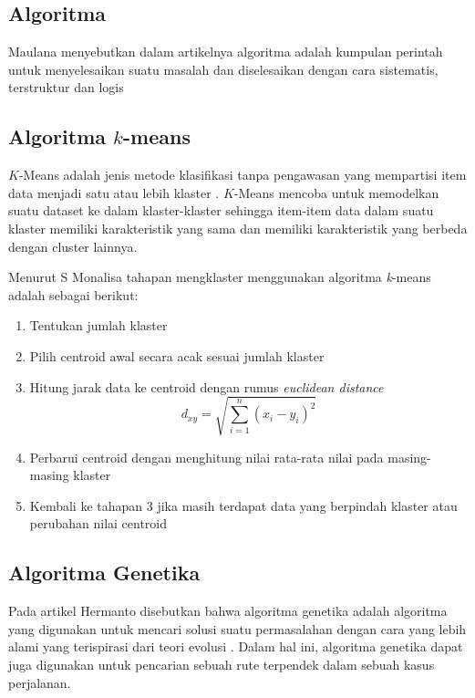 \subsection{Algoritma}

Maulana menyebutkan dalam artikelnya algoritma adalah kumpulan perintah untuk menyelesaikan suatu masalah dan diselesaikan dengan cara sistematis, terstruktur dan logis \cite{maulana2017pembelajaran}

\subsection{Algoritma $k$-means}

$K$-Means adalah jenis metode klasifikasi tanpa pengawasan yang mempartisi item data menjadi satu atau lebih klaster \cite{agusta2007k}. $K$-Means mencoba untuk memodelkan suatu dataset ke dalam klaster-klaster sehingga item-item data dalam suatu klaster memiliki karakteristik yang sama dan memiliki karakteristik yang berbeda dengan cluster lainnya.

Menurut S Monalisa \cite{monalisa2018klasterisasi} tahapan mengklaster menggunakan algoritma \textit{k}-means adalah sebagai berikut:

\begin{enumerate}
	\item Tentukan jumlah klaster
	\item Pilih centroid awal secara acak sesuai jumlah klaster
	\item Hitung jarak data ke centroid dengan rumus \textit{euclidean distance}
	\begin{equation}
	d_{xy}=\sqrt{\sum_{i=1}^{n}(x_i-y_i)^{2}}
	\end{equation}
	\item Perbarui centroid dengan menghitung nilai rata-rata nilai pada masing-masing klaster
	\item Kembali ke tahapan 3 jika masih terdapat data yang berpindah klaster atau perubahan nilai centroid
\end{enumerate}

\subsection{Algoritma Genetika}

Pada artikel Hermanto disebutkan bahwa algoritma genetika adalah algoritma yang digunakan untuk mencari solusi suatu permasalahan dengan cara yang lebih alami yang terispirasi dari teori evolusi  \cite{hermawanto2003algoritma}. Dalam hal ini, algoritma genetika dapat juga digunakan untuk pencarian sebuah rute terpendek dalam sebuah kasus perjalanan.

